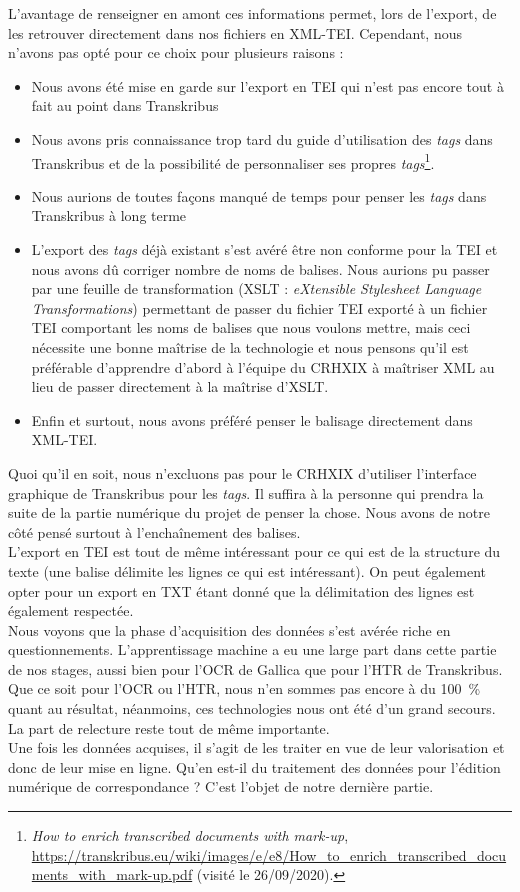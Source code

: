 L'avantage de renseigner en amont ces informations permet, lors de l'export, de les retrouver directement dans nos fichiers en XML-TEI. 
Cependant, nous n'avons pas opté pour ce choix pour plusieurs raisons : 
\begin{itemize}
    \item Nous avons été mise en garde sur l'export en TEI qui n'est pas encore tout à fait au point dans Transkribus
    \item Nous avons pris connaissance trop tard du guide d'utilisation des \emph{tags} dans Transkribus et de la possibilité de personnaliser ses propres \emph{tags}\footnote{\emph{How to enrich transcribed documents with mark-up}, \url{https://transkribus.eu/wiki/images/e/e8/How_to_enrich_transcribed_documents_with_mark-up.pdf} (visité le 26/09/2020).}.
    \item Nous aurions de toutes façons manqué de temps pour penser les \emph{tags} dans Transkribus à long terme
    \item L'export des \emph{tags} déjà existant s'est avéré être non conforme pour la TEI et nous avons dû corriger nombre de noms de balises.
    Nous aurions pu passer par une feuille de transformation (XSLT : \emph{eXtensible Stylesheet Language Transformations}) permettant de passer du fichier TEI exporté à un fichier TEI comportant les noms de balises que nous voulons mettre, mais ceci nécessite une bonne maîtrise de la technologie et nous pensons qu'il est préférable d'apprendre d'abord à l'équipe du CRHXIX à maîtriser XML au lieu de passer directement à la maîtrise d'XSLT. 
    \item Enfin et surtout, nous avons préféré penser le balisage directement dans XML-TEI. 
\end{itemize}

Quoi qu'il en soit, nous n'excluons pas pour le CRHXIX d'utiliser l'interface graphique de Transkribus pour les \emph{tags}. Il suffira à la personne qui prendra la suite de la partie numérique du projet de penser la chose. Nous avons de notre côté pensé surtout à l'enchaînement des balises.\\


L'export en TEI est tout de même intéressant pour ce qui est de la structure du texte (une balise délimite les lignes ce qui est intéressant). On peut également opter pour un export en TXT étant donné que la délimitation des lignes est également respectée. \\

Nous voyons que la phase d'acquisition des données s'est avérée riche en questionnements. L'apprentissage machine a eu une large part dans cette partie de nos stages, aussi bien pour l'OCR de Gallica que pour l'HTR de Transkribus. Que ce soit pour l'OCR ou l'HTR, nous n'en sommes pas encore à du 100~\% quant au résultat, néanmoins, ces technologies nous ont été d'un grand secours. La part de relecture reste tout de même importante. \\

Une fois les données acquises, il s'agit de les traiter en vue de leur valorisation et donc de leur mise en ligne. 
Qu'en est-il du traitement des données pour l'édition numérique de correspondance ? 
C'est l'objet de notre dernière partie.

